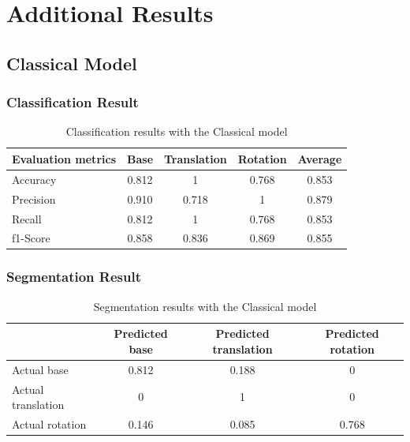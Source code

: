 \chapter{Additional Results} \label{chap:Appendix}
\section{Classical Model}
\label{sec:ClassicalModel}
\subsection{Classification Result}
\begin{table}[H]
        \begin{center}
                \begin{tabular}{|l||c|c|c|c|}
                        \hline 
                        Evaluation metrics & Base & Translation & Rotation & Average \\
                        \hline \hline
                        Accuracy & 0.812 & 1 & 0.768 & 0.853 \\
                        \hline
                        Precision & 0.910 & 0.718 & 1 & 0.879 \\
                        \hline
                        Recall & 0.812 & 1 & 0.768 & 0.853 \\
                        \hline
                        f1-Score & 0.858 & 0.836 & 0.869 & 0.855 \\
                        \hline
                \end{tabular}
        \end{center}
        \caption{Classification results with the Classical model}
\end{table}
\subsection{Segmentation Result}
\begin{table}[H]
        \begin{center}
                \begin{tabular}{|l||c|c|c|}
                        \hline 
                         & Predicted base & Predicted translation & Predicted rotation \\
                        \hline \hline
                        Actual base & 0.812 & 0.188 & 0 \\
                        \hline
                        Actual translation & 0 & 1 & 0 \\
                        \hline
                        Actual rotation & 0.146 & 0.085 & 0.768 \\
                        \hline
                \end{tabular}
        \end{center}
        \caption{Segmentation results with the Classical model}
\end{table}
